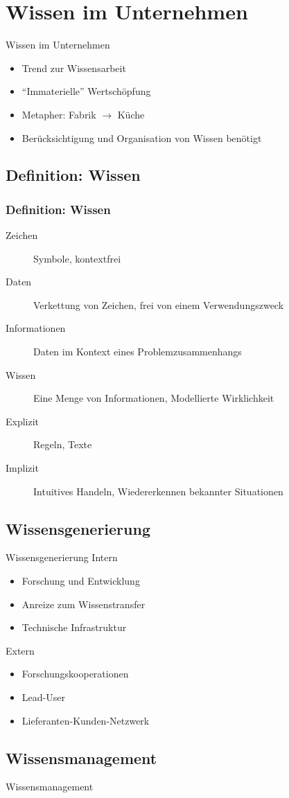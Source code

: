 
\frame{\titlepage}

\section{Wissen im Unternehmen}


\begin{frame}{Wissen im Unternehmen}
\begin{itemize}
 \item Trend zur Wissensarbeit
 \item ``Immaterielle'' Wertschöpfung
 \item Metapher: Fabrik $\rightarrow$ Küche
 \item Berücksichtigung und Organisation von Wissen benötigt
\end{itemize}
\end{frame}

\subsection{Definition: Wissen}
\begin{frame}[allowframebreaks]
\frametitle{Definition: Wissen}
\begin{description}
 \item[Zeichen] Symbole, kontextfrei
 \item[Daten] Verkettung von Zeichen, frei von einem Verwendungszweck
 \item[Informationen] Daten im Kontext eines Problemzusammenhangs
 \item[Wissen] Eine Menge von Informationen, Modellierte Wirklichkeit
\end{description}
\framebreak
\begin{description}
 \item[Explizit] Regeln, Texte
 \item[Implizit] Intuitives Handeln, Wiedererkennen bekannter Situationen
\end{description}
\end{frame}

\subsection{Wissensgenerierung}
\begin{frame}{Wissensgenerierung}
Intern
\begin{itemize}
 \item Forschung und Entwicklung
 \item Anreize zum Wissenstransfer
 \item Technische Infrastruktur
\end{itemize}
Extern
\begin{itemize}
 \item Forschungskooperationen
 \item Lead-User
 \item Lieferanten-Kunden-Netzwerk
\end{itemize}
\end{frame}

\subsection{Wissensmanagement}
\begin{frame}{Wissensmanagement}
\end{frame}


